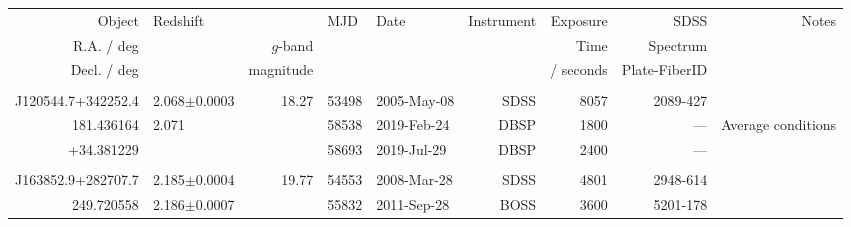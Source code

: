 \documentclass[a4paper,fleqn,usenatbib]{mnras}
\begin{document}
\begin{table}
  \centering
  \begin{tabular}{r l   r ll   r r r r}
    \hline 
    \hline 
    Object                           & \multirow{3}{*}{Redshift}  &                       & \multirow{3}{*}{MJD} & \multirow{3}{*}{Date} & \multirow{3}{*}{Instrument}  & Exposure      & SDSS                        & \multirow{3}{*}{Notes} \\
    R.A. / deg                     &                                         &   {$g$-band}   &                                 &                                  &                                               &  Time           & Spectrum                 & \\
    Decl. / deg                   &                                         &    magnitude   &                                &                                   &                                              &  / seconds    & Plate-FiberID  & \\
    \hline  
                                         &                                         &                        &                &                            &                    &                              &                              & \\
    J120544.7+342252.4   & 2.068$\pm$0.0003         &   18.27             &  53498   &  2005-May-08   & SDSS             &  8057                  & 2089-427             & \\
    181.436164                  & 2.071                              &                         &  58538   &  2019-Feb-24    & DBSP            &  1800                  &  ---                      &  Average conditions \\
    +34.381229                 &                                        &                          &  58693   &  2019-Jul-29     & DBSP            &  2400                   &  ---                      &   \\
                                         &                                       &                          &                &                          &                    &                               &                              & \\
    J163852.9+282707.7   & 2.185$\pm$0.0004       &   19.77              &  54553    & 2008-Mar-28     & SDSS           &   4801                    &  2948-614              & \\
    249.720558	                 &  2.186$\pm$0.0007     &                          &  55832    & 2011-Sep-28     & BOSS            &   3600                   &  5201-178            & \\

\end{tabular}
\end{table}
\end{document}
